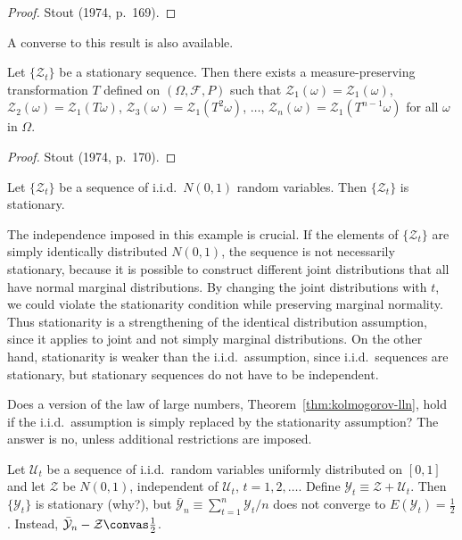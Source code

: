 \begin{proof}
Stout (1974, p.~169). \qedhere
\end{proof}

A converse to this result is also available.

\begin{proposition}\label{prop:stationary-converse}
Let $\{\mathcal{Z}_t\}$ be a stationary sequence. Then there exists a measure-preserving transformation $T$ defined on $(\Omega, \mathcal{F}, P)$ such that $\mathcal{Z}_1(\omega) = \mathcal{Z}_1(\omega)$, $\mathcal{Z}_2(\omega) = \mathcal{Z}_1(T\omega)$, $\mathcal{Z}_3(\omega) = \mathcal{Z}_1(T^2\omega)$, $\ldots$, $\mathcal{Z}_n(\omega) = \mathcal{Z}_1(T^{n-1}\omega)$ for all $\omega$ in $\Omega$.
\end{proposition}

\begin{proof}
Stout (1974, p.~170). \qedhere
\end{proof}

\begin{example}\label{ex:iid-normal-stationary}
Let $\{\mathcal{Z}_t\}$ be a sequence of i.i.d.\ $N(0,1)$ random variables. Then $\{\mathcal{Z}_t\}$ is stationary.
\end{example}

The independence imposed in this example is crucial. If the elements of $\{\mathcal{Z}_t\}$ are simply identically distributed $N(0,1)$, the sequence is not necessarily stationary, because it is possible to construct different joint distributions that all have normal marginal distributions. By changing the joint distributions with $t$, we could violate the stationarity condition while preserving marginal normality. Thus stationarity is a strengthening of the identical distribution assumption, since it applies to joint and not simply marginal distributions. On the other hand, stationarity is weaker than the i.i.d.\ assumption, since i.i.d.\ sequences are stationary, but stationary sequences do not have to be independent.

Does a version of the law of large numbers, Theorem~\ref{thm:kolmogorov-lln}, hold if the i.i.d.\ assumption is simply replaced by the stationarity assumption? The answer is no, unless additional restrictions are imposed.

\begin{example}\label{ex:stationary-no-lln}
Let $\mathcal{U}_t$ be a sequence of i.i.d.\ random variables uniformly distributed on $[0,1]$ and let $\mathcal{Z}$ be $N(0,1)$, independent of $\mathcal{U}_t$, $t = 1, 2, \ldots$. Define $\mathcal{Y}_t \equiv \mathcal{Z} + \mathcal{U}_t$. Then $\{\mathcal{Y}_t\}$ is stationary (why?), but $\bar{\mathcal{Y}}_n \equiv \sum_{t=1}^{n} \mathcal{Y}_t / n$ does not converge to $E(\mathcal{Y}_t) = \frac{1}{2}$. Instead, $\bar{\mathcal{Y}}_n - \mathcal{Z} \convas \frac{1}{2}$.
\end{example}

